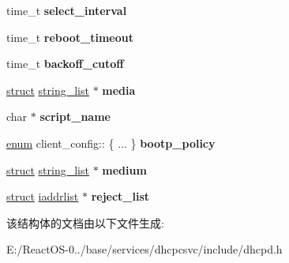 \begin{DoxyCompactItemize}
\item 
\mbox{\label{structclient__config_a867fb1145aecda41fb6d7195875aae60}} 
time\+\_\+t {\bfseries select\+\_\+interval}
\item 
\mbox{\label{structclient__config_a80bf067977245cedba8a3f05fbeaeee1}} 
time\+\_\+t {\bfseries reboot\+\_\+timeout}
\item 
\mbox{\label{structclient__config_af466d13f06c27bde199eea9468b7846e}} 
time\+\_\+t {\bfseries backoff\+\_\+cutoff}
\item 
\mbox{\label{structclient__config_abc9ae3ee5b47c2fba516d3d63c3ff9c1}} 
\hyperlink{interfacestruct}{struct} \hyperlink{structstring__list}{string\+\_\+list} $\ast$ {\bfseries media}
\item 
\mbox{\label{structclient__config_a7caaf8aba0dedd4105db4cf9c5b9f76f}} 
char $\ast$ {\bfseries script\+\_\+name}
\item 
\mbox{\label{structclient__config_a8276d6f7bd2555adee0898423ff568ce}} 
\hyperlink{interfaceenum}{enum} client\+\_\+config\+:: \{ ... \}  {\bfseries bootp\+\_\+policy}
\item 
\mbox{\label{structclient__config_ab473cb5115d589c9fc1cb535669c1507}} 
\hyperlink{interfacestruct}{struct} \hyperlink{structstring__list}{string\+\_\+list} $\ast$ {\bfseries medium}
\item 
\mbox{\label{structclient__config_ab3994848c4b11666e0c6fe776e08cf60}} 
\hyperlink{interfacestruct}{struct} \hyperlink{structiaddrlist}{iaddrlist} $\ast$ {\bfseries reject\+\_\+list}
\end{DoxyCompactItemize}


该结构体的文档由以下文件生成\+:\begin{DoxyCompactItemize}
\item 
E\+:/\+React\+O\+S-\/0../base/services/dhcpcsvc/include/dhcpd.\+h\end{DoxyCompactItemize}
